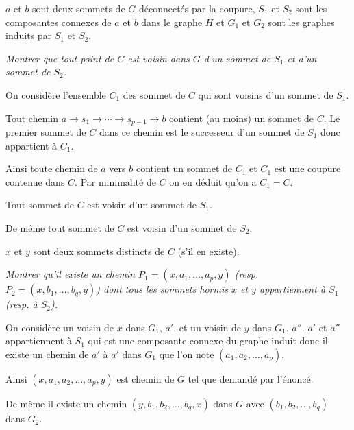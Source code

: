 $a$ et $b$ sont deux sommets de $G$ déconnectés par la coupure, $S_1$ et $S_2$ sont les composantes connexes de $a$ et $b$ dans le graphe $H$ et $G_1$ et $G_2$ sont les graphes induits par $S_1$ et $S_2$. 
\begin{Exercise}\it
Montrer que tout point de $C$ est voisin dans $G$ d'un sommet de $S_1$ et d'un sommet de $S_2$.
\end{Exercise}  
\begin{Answer} 

On considère l'ensemble $C_1$ des sommet de $C$ qui sont voisins d'un sommet de $S_1$. 

Tout chemin $a\rightarrow s_1 \rightarrow \cdots \rightarrow s_{p-1} \rightarrow  b$ contient (au moins) un sommet de $C$. Le premier sommet de $C$ dans ce chemin est le successeur d'un sommet de $S_1$ donc appartient à $C_1$.

Ainsi toute chemin de $a$ vers $b$ contient un sommet de $C_1$ et $C_1$ est une coupure contenue dans $C$. Par minimalité de $C$ on en déduit qu'on a $C_1=C$. 

Tout sommet de $C$ est voisin d'un sommet de $S_1$.

De même tout sommet de $C$ est voisin d'un sommet de $S_2$.
\end{Answer}
$x$ et $y$ sont deux sommets distincts de $C$ (s'il en existe).
\begin{Exercise}\it
Montrer qu'il existe un chemin $P_1=(x,a_1,\dots,a_p,y)$ (resp. $P_2=(x,b_1,\dots,b_q,y)$) dont tous les sommets hormis $x$ et $y$ appartiennent à $S_1$ (resp. à $S_2$).
\end{Exercise}  
\begin{Answer}
On considère un voisin de $x$ dans $G_1$, $a'$, et un voisin de $y$ dans $G_1$, $a''$. $a'$ et $a''$ appartiennent à $S_1$ qui est une composante connexe du graphe induit donc il existe un chemin de $a'$ à $a'$ dans $G_1$ que l'on note $(a_1,a_2, \ldots,a_p)$.

Ainsi $(x, a_1,a_2, \ldots,a_p,y)$ est chemin de $G$ tel que demandé par l'énoncé.

De même il existe un chemin $(y, b_1,b_2, \ldots,b_q,x)$ dans $G$ avec $(b_1,b_2, \ldots,b_q)$ dans $G_2$.
\end{Answer}

